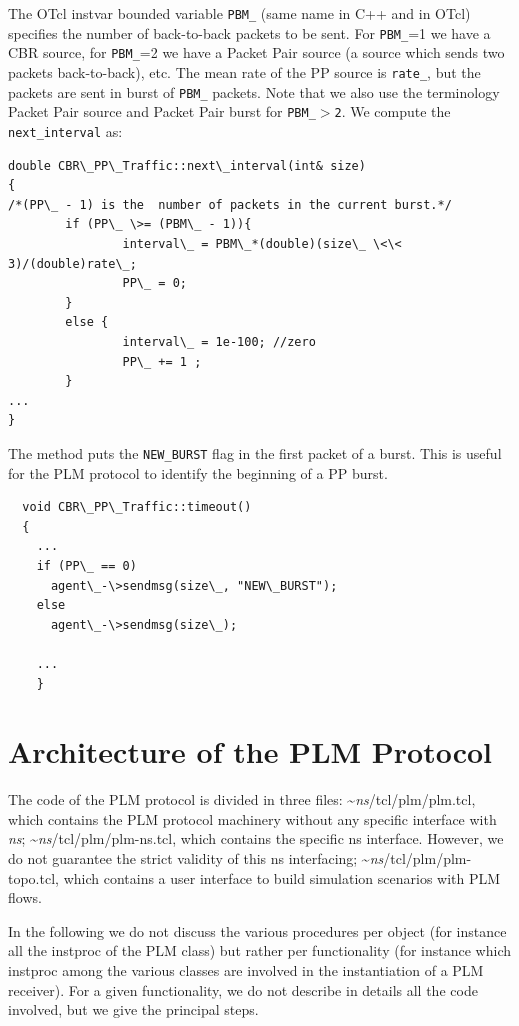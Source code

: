 {The OTcl instvar bounded variable {\tt PBM\_} (same name in C++ and in OTcl)
specifies the number of back-to-back packets to be sent. For {\tt PBM\_}=1 we
have a CBR source, for {\tt PBM\_}=2 we have a Packet Pair source (a source which
sends two packets back-to-back), etc. The mean rate of the PP source is
{\tt rate\_}, but the packets are sent in burst of {\tt PBM\_} packets. Note
that we also use the terminology Packet Pair source and Packet Pair burst for
{\tt PBM\_$>$2}.
We compute the {\tt next\_interval} as:
\begin{verbatim}
double CBR\_PP\_Traffic::next\_interval(int& size)
{
/*(PP\_ - 1) is the  number of packets in the current burst.*/
        if (PP\_ \>= (PBM\_ - 1)){         
                interval\_ = PBM\_*(double)(size\_ \<\< 3)/(double)rate\_;
                PP\_ = 0;
        }
        else {
                interval\_ = 1e-100; //zero
                PP\_ += 1 ;
        }
...
}
\end{verbatim}

The  method puts the {\tt NEW\_BURST} flag in the first packet of a
burst. This is useful for the PLM protocol to identify the beginning of a PP
burst.

\begin{verbatim}
  void CBR\_PP\_Traffic::timeout()
  {
    ...
    if (PP\_ == 0) 
      agent\_-\>sendmsg(size\_, "NEW\_BURST");
    else 
      agent\_-\>sendmsg(size\_);
    
    ...
    }
\end{verbatim}

\section{Architecture of the PLM Protocol}
The code of the PLM protocol is divided in three files: \textasciitilde\emph{ns}/{tcl/plm/plm.tcl},
which contains the PLM protocol machinery without any specific interface with
\emph{ns}; \textasciitilde\emph{ns}/{tcl/plm/plm-ns.tcl}, which contains the specific ns interface.
However, we do not guarantee the strict validity of this ns interfacing;
\textasciitilde\emph{ns}/{tcl/plm/plm-topo.tcl}, which contains a user interface to build simulation
scenarios with PLM flows. 

In the following we do not discuss the various procedures per object (for
instance all the instproc of the PLM class)  but rather per functionality (for
instance which instproc among the various classes are involved in the instantiation
of a PLM receiver). For a given functionality, we do not describe in details all
the code involved, but we give the principal steps.



}
